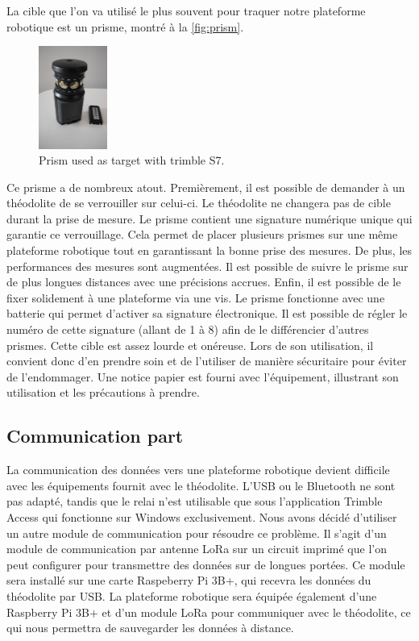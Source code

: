 \documentclass[10pt,letterpaper,oneside]{article}
\begin{document}
La cible que l'on va utilisé le plus souvent pour traquer notre plateforme robotique est un prisme, montré à la \autoref{fig:prism}.

\begin{figure}[htb]
	\centering
	\includegraphics[width=0.2\textwidth]{./figs/prism.JPG}
	\caption{Prism used as target with trimble S7.}
	\label{fig:prism}
\end{figure}

Ce prisme a de nombreux atout.
Premièrement, il est possible de demander à un théodolite de se verrouiller sur celui-ci.
Le théodolite ne changera pas de cible durant la prise de mesure.
Le prisme contient une signature numérique unique qui garantie ce verrouillage.
Cela permet de placer plusieurs prismes sur une même plateforme robotique tout en garantissant la bonne prise des mesures.
De plus, les performances des mesures sont augmentées.
Il est possible de suivre le prisme sur de plus longues distances avec une précisions accrues.
Enfin, il est possible de le fixer solidement à une plateforme via une vis.
Le prisme fonctionne avec une batterie qui permet d'activer sa signature électronique. 
Il est possible de régler le numéro de cette signature (allant de 1 à 8) afin de le différencier d'autres prismes.
Cette cible est assez lourde et onéreuse.
Lors de son utilisation, il convient donc d'en prendre soin et de l'utiliser de manière sécuritaire pour éviter de l'endommager.
Une notice papier est fourni avec l'équipement, illustrant son utilisation et les précautions à prendre.

\subsection{Communication part}

La communication des données vers une plateforme robotique devient difficile avec les équipements fournit avec le théodolite.
L'USB ou le Bluetooth ne sont pas adapté, tandis que le relai n'est utilisable que sous l'application Trimble Access qui fonctionne sur Windows exclusivement.
Nous avons décidé d'utiliser un autre module de communication pour résoudre ce problème.
Il s'agit d'un module de communication par antenne LoRa sur un circuit imprimé que l'on peut configurer pour transmettre des données sur de longues portées.
Ce module sera installé sur une carte Raspeberry Pi 3B+, qui recevra les données du théodolite par USB.
La plateforme robotique sera équipée également d'une Raspberry Pi 3B+ et d'un module LoRa pour communiquer avec le théodolite, ce qui nous permettra de sauvegarder les données à distance.
\end{document}
